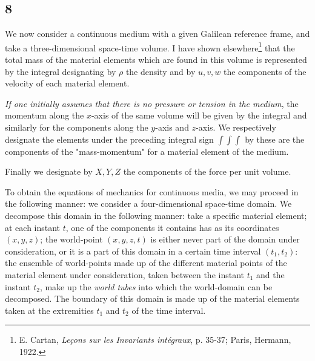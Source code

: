 \subsection*{8}
We now consider a continuous medium with a given Galilean reference frame, and take a three-dimensional space-time volume. I have shown elsewhere\footnote{E. Cartan, \textit{Leçons sur les Invariants intégraux}, p. 35-37; Paris, Hermann, 1922.} that the total mass of the material elements which are found in this volume is represented by the integral
designating by $\rho$ the density and by $u,v,w$ the components of the velocity of each material element.

\textit{If one initially assumes that there is no pressure or tension in the medium}, the momentum along the $x$-axis of the same volume will be given by the integral
and similarly for the components along the $y$-axis and $z$-axis. We respectively designate the elements under the preceding integral sign $\int\int\int$ by
these are the components of the "mass-momentum" for a material element of the medium.

Finally we designate by $X,Y,Z$ the components of the force per unit volume.

To obtain the equations of mechanics for continuous media, we may proceed in the following manner: we consider a four-dimensional space-time domain. We decompose this domain in the following manner: take a specific material element; at each instant $t$, one of the components it contains has as its coordinates $(x,y,z)$; the world-point $(x,y,z,t)$ is either never part of the domain under consideration, or it is a part of this domain in a certain time interval $(t_1,t_2)$: the ensemble of world-points made up of the different material points of the material element under consideration, taken between the instant $t_1$ and the instant $t_2$, make up the \textit{world tubes} into which the world-domain can be decomposed. The boundary of this domain is made up of the material elements taken at the extremities $t_1$ and $t_2$ of the time interval.

